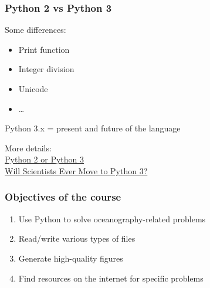 \begin{frame}[fragile]
\frametitle{Python 2 vs Python 3}

Some differences:
\begin{itemize}
\item Print function
\item Integer division
\item Unicode
\item \ldots
\end{itemize}

Python 3.x = present and future of the language

\vfill

More details:\\
\href{https://wiki.python.org/moin/Python2orPython3}{Python 2 or Python 3}\\
\href{https://jakevdp.github.io/blog/2013/01/03/will-scientists-ever-move-to-python-3/}{Will Scientists Ever Move to Python 3?}

\end{frame}



\begin{frame}[fragile]
\frametitle{Objectives of the course}

\begin{enumerate}
\item<1-> Use Python to solve oceanography-related problems
\item<2-> Read/write various types of files
\item<3-> Generate high-quality figures
\item<4-> Find resources on the internet for specific problems
\end{enumerate}

\vspace{.5cm}


\end{frame}

